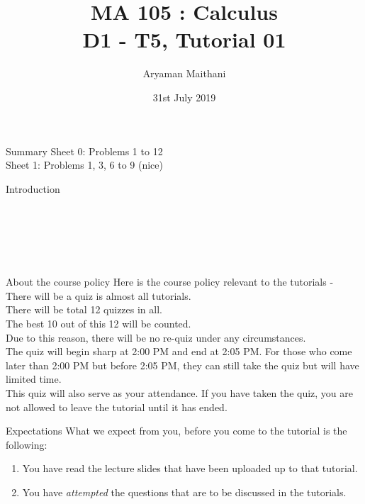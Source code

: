 \documentclass[handout, aspectratio=169]{beamer}
\title{MA 105 : Calculus\\ D1 - T5, Tutorial 01}
\author{Aryaman Maithani}
\date[31-07-2019]{31st July 2019}
\institute[IITB]{IIT Bombay}
\begin{document}
\begin{frame}
    \titlepage
\end{frame}
\begin{frame}{Summary} 
    Sheet 0: Problems 1 to 12\\    
    Sheet 1: Problems 1, 3, 6 to 9 (nice)
\end{frame}

\begin{frame}{Introduction}
    \\
    \\
    \\
    \\
    \\
    \\
\end{frame}
\begin{frame}{About the course policy}
    Here is the course policy relevant to the tutorials -\\
    There will be a quiz is almost all tutorials.\\
    There will be total 12 quizzes in all.\\
    The best 10 out of this 12 will be counted.\\
    Due to this reason, there will be no re-quiz under any circumstances.\\
    The quiz will begin sharp at 2:00 PM and end at 2:05 PM. For those who come later than 2:00 PM but before 2:05 PM, they can still take the quiz but will have limited time.\\
    This quiz will also serve as your attendance. If you have taken the quiz, you are not allowed to leave the tutorial until it has ended.
\end{frame}
\begin{frame}{Expectations}
    What we expect from you, before you come to the tutorial is the following:
    \begin{enumerate}
        \item You have read the lecture slides that have been uploaded up to that tutorial.
        \item You have \emph{attempted} the questions that are to be discussed in the tutorials.
    \end{enumerate}
\end{frame}
\end{document}
